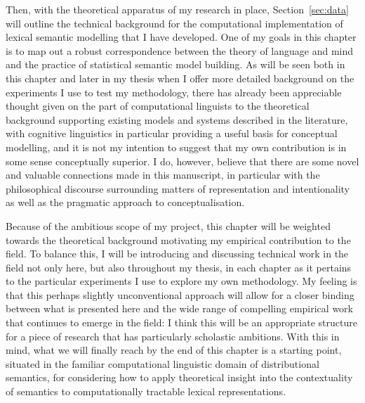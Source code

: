 Then, with the theoretical apparatus of my research in place, Section~\ref{sec:data} will outline the technical background for the computational implementation of lexical semantic modelling that I have developed.  One of my goals in this chapter is to map out a robust correspondence between the theory of language and mind and the practice of statistical semantic model building.  As will be seen both in this chapter and later in my thesis when I offer more detailed background on the experiments I use to test my methodology, there has already been appreciable thought given on the part of computational linguists to the theoretical background supporting existing models and systems described in the literature, with cognitive linguistics in particular providing a useful basis for conceptual modelling, and it is not my intention to suggest that my own contribution is in some sense conceptually superior.  I do, however, believe that there are some novel and valuable connections made in this manuscript, in particular with the philosophical discourse surrounding matters of representation and intentionality as well as the pragmatic approach to conceptualisation.

Because of the ambitious scope of my project, this chapter will be weighted towards the theoretical background motivating my empirical contribution to the field.  To balance this, I will be introducing and discussing technical work in the field not only here, but also throughout my thesis, in each chapter as it pertains to the particular experiments I use to explore my own methodology.  My feeling is that this perhaps slightly unconventional approach will allow for a closer binding between what is presented here and the wide range of compelling empirical work that continues to emerge in the field: I think this will be an appropriate structure for a piece of research that has particularly scholastic ambitions.  With this in mind, what we will finally reach by the end of this chapter is a starting point, situated in the familiar computational linguistic domain of distributional semantics, for considering how to apply theoretical insight into the contextuality of semantics to computationally tractable lexical representations.

